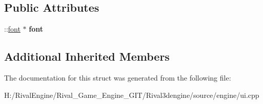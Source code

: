 \subsection*{Public Attributes}
\begin{DoxyCompactItemize}
\item 
\mbox{\label{struct_u_i_1_1_font_ac9674071551e52887851a6a60f0e8757}} 
\+::\hyperlink{structfont}{font} $\ast$ {\bfseries font}
\end{DoxyCompactItemize}
\subsection*{Additional Inherited Members}


The documentation for this struct was generated from the following file\+:\begin{DoxyCompactItemize}
\item 
H\+:/\+Rival\+Engine/\+Rival\+\_\+\+Game\+\_\+\+Engine\+\_\+\+G\+I\+T/\+Rival3dengine/source/engine/ui.\+cpp\end{DoxyCompactItemize}
